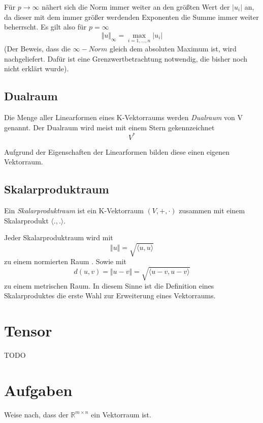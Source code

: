 Für $p \longrightarrow \infty$ nähert sich die Norm immer weiter an den größten Wert der $\vert u_i \vert$ an, da dieser mit dem immer größer werdenden Exponenten die Summe immer weiter beherrscht. Es gilt also für $p=\infty$
\[
\Vert u \Vert_\infty = \max_{i=1,\dots, n}  \vert u_i\vert
\]
(Der Beweis, dass die $\infty -Norm$ gleich dem absoluten Maximum ist, wird nachgeliefert. Dafür ist eine Grenzwertbetrachtung notwendig, die bisher noch nicht erklärt wurde).

\subsection{Dualraum}

\begin{definition}
Die Menge aller Linearformen eines K-Vektorraums werden \textsl{Dualraum} von V genannt. Der Dualraum wird meist mit einem Stern gekennzeichnet
\[V^* \]
\end{definition}

Aufgrund der Eigenschaften der Linearformen bilden diese einen eigenen Vektorraum. 

\subsection{Skalarproduktraum}

\begin{definition}\label{skpr}
Ein \textsl{Skalarproduktraum} ist ein K-Vektorraum $(V,+,\cdot)$ zusammen mit einem Skalarprodukt $\langle .,. \rangle$.
\end{definition}

Jeder Skalarproduktraum wird mit 
\[ \Vert u \Vert = \sqrt{\langle u,u \rangle} \]
zu einem normierten Raum . Sowie mit 
\[ 
d(u,v) = \Vert u-v \Vert = \sqrt{\langle u-v,u-v \rangle}
\]
zu einem metrischen Raum.  In diesem Sinne ist die Definition eines Skalarproduktes die erste Wahl zur Erweiterung eines Vektorraums. 



\section{Tensor}

TODO

\section{Aufgaben}

\begin{prob}
\label{matrix.1}

Weise nach, dass der $\mathbb{R}^{m\times n}$ ein Vektorraum ist. 

\end{prob}



